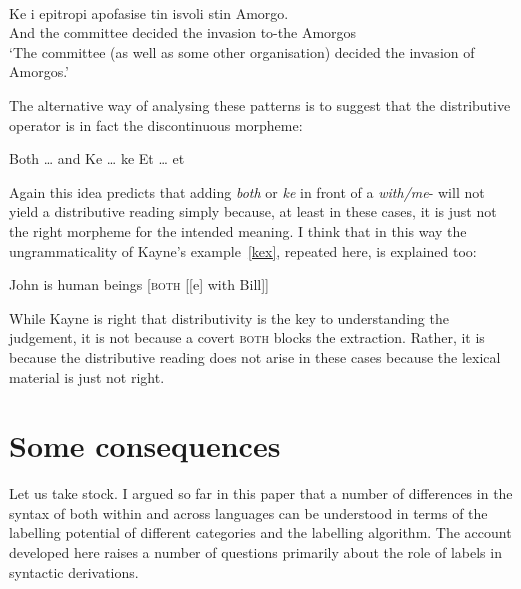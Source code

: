 \documentclass[output=paper]{langsci/langscibook}
\begin{document}
\ea\label{ex:29.51} \\
	\gll    Ke i epitropi apofasise tin isvoli stin Amorgo.\\
            And the committee decided the invasion to-the Amorgos\\
    \glt    \enquote*{The committee (as well as some other organisation)
    decided the invasion of Amorgos.}
\z

The alternative way of analysing these patterns is to suggest that the
distributive operator is in fact the discontinuous morpheme:

\ea\label{ex:29.52}
    \ea Both \ldots{} and
    \ex Ke \ldots{} ke
    \ex Et \ldots{} et
    \z
\z

Again this idea predicts that adding \emph{both} or \emph{ke} in front of a
\emph{with/me}- will not yield a distributive reading simply
because, at least in these cases, it is just not the right morpheme for the
intended meaning. I think that in this way the ungrammaticality of Kayne's
example~\eqref{kex}, repeated here, is explained too:

\ea\label{ex:29.53}
    John is human beings [\textsc{both} [[e] with Bill]]
\z

While Kayne is right that distributivity is the key to understanding the
judgement, it is not because a covert \textsc{both} blocks the extraction. Rather, it is
because the distributive reading does not arise in these cases because the
lexical material is just not right.

\section{Some consequences}\label{consequences}

Let us take stock. I argued so far in this paper that a number of differences
in the syntax of  both within and across languages can be
understood in terms of the labelling potential of different
categories and the labelling algorithm. The account developed here raises a
number of questions primarily about the role of labels in syntactic
derivations.
\end{document}
